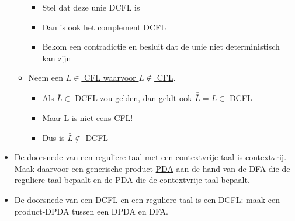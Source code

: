 \documentclass[kulak]{kulakarticle}
\theoremstyle{definition}
\begin{document}
\begin{itemize}
\begin{itemize}
\begin{itemize}
				\item Stel dat deze unie DCFL is
				\item Dan is ook het complement DCFL
				\item Bekom een contradictie en besluit dat de unie niet deterministisch kan zijn
			\end{itemize}
			\item Neem een \underline{\(L \in\) CFL waarvoor \(\bar{L} \notin\) CFL}. \begin{itemize}
				\item Als \(\bar{L} \in\) DCFL zou gelden, dan geldt ook \(\bar{\bar{L}}=L\in\) DCFL
				\item Maar L is niet eens CFL!
				\item Dus is \(\bar{L} \notin\) DCFL
			\end{itemize}
		\end{itemize}
		\item De doorsnede van een reguliere taal met een contextvrije taal is \underline{contextvrij}. Maak daarvoor een generische product-\underline{PDA} aan de hand van de DFA die de reguliere taal bepaalt en de PDA die de contextvrije taal bepaalt.
		\item De doorsnede van een DCFL en een reguliere taal is een DCFL: maak een product-DPDA tussen een DPDA en DFA.
	\end{itemize}
\end{document}
